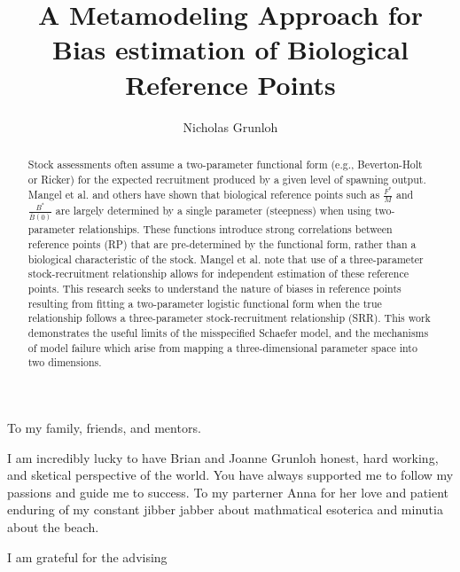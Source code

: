 \documentclass[12pt]{ucscthesis}
\title{A Metamodeling Approach for Bias estimation of Biological Reference Points}
\author{Nicholas Grunloh}
\begin{document}
%
\begin{frontmatter}

%
\maketitle
\copyrightpage
%
\tableofcontents
\listoffigures

%
\begin{abstract}
Stock assessments often assume a two-parameter functional form
(e.g., Beverton-Holt or Ricker) for the expected recruitment produced by a
given level of spawning output. Mangel et al. \cite{mangel_perspective_2013} %
and others have shown that biological reference points such as $\frac{F^*}{M}$
and $\frac{B^*}{\bar{B}(0)}$ are largely determined by a single parameter
(steepness) when using two-parameter relationships. These functions introduce
strong correlations between reference points (RP) that are pre-determined by
the functional form, rather than a biological characteristic of the stock.
Mangel et al. note that use of a three-parameter stock-recruitment
relationship allows for independent estimation of these reference points. This
research seeks to understand the nature of biases in reference points
resulting from fitting a two-parameter logistic functional form when the true
relationship follows a three-parameter stock-recruitment relationship (SRR). This  %
work demonstrates the useful limits of the misspecified Schaefer model, and
the mechanisms of model failure which arise from mapping a three-dimensional
parameter space into two dimensions.
\end{abstract}

%
\begin{dedication}
\null\vfil
{\large 
\begin{center}
To my family, friends, and mentors.
\end{center}}
\vfil\null
\end{dedication}

%
\begin{acknowledgements}

%
I am incredibly lucky to have Brian and Joanne Grunloh 
honest, hard working, and sketical perspective of the world.
You have always supported me to follow my passions and 
guide me to success. To my parterner Anna for her love and 
patient enduring of my constant jibber jabber about mathmatical 
esoterica and minutia about the beach.

%
I am grateful for the advising 



\end{acknowledgements}
\end{frontmatter}
\end{document}
